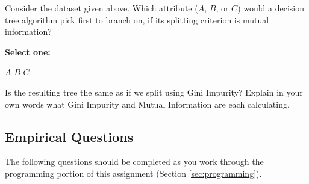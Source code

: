 \begin{questions}
\clearpage

    \question[1] Consider the dataset given above. Which attribute ($A$, $B$, or $C$) would a decision tree algorithm pick first to branch on, if its splitting criterion is mutual information?
    
    \textbf{Select one:}
    \begin{checkboxes}
        \choice $A$
        \choice $B$
        \choice $C$
    \end{checkboxes}
    
    
    \question[3] Is the resulting tree the same as if we split using Gini Impurity? Explain in your own words what Gini Impurity and Mutual Information are each calculating.
    
    \begin{tcolorbox}[fit,height=7cm, width=15cm, blank, borderline={1pt}{-2pt},nobeforeafter]
    \end{tcolorbox}
    

\end{questions}

\clearpage
\subsection{Empirical Questions}
\label{sec:empirical}

The following questions should be completed as you work through the programming portion of this assignment (Section \ref{sec:programming}).

